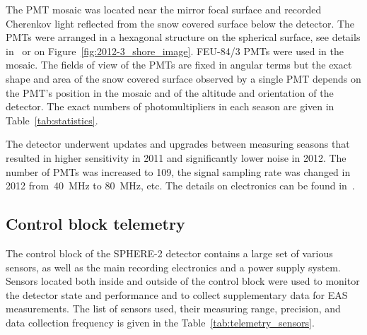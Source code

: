 \documentclass[universe,article,submit,moreauthors,pdftex]{Definitions/mdpi}
\begin{document}
The PMT mosaic was located near the mirror focal surface and recorded Cherenkov light reflected from the snow covered surface below the detector. The PMTs were arranged in a hexagonal structure on the spherical surface, see details in~\cite{Ant20} or on Figure~\ref{fig:2012-3_shore_image}. FEU-84/3 PMTs were used in the mosaic. The fields of view of the PMTs are fixed in angular terms but the exact shape and area of the snow covered surface observed by a single PMT depends on the PMT's position in the mosaic and of the altitude and orientation of the detector. The exact numbers of photomultipliers in each season are given in Table~\ref{tab:statistics}. 

The detector underwent updates and upgrades between measuring seasons that resulted in higher sensitivity in 2011 and significantly lower noise in 2012. The number of PMTs was increased to 109, the signal sampling rate was changed in 2012 from~40~MHz to 80~MHz, etc. The details on electronics can be found in~\cite{Ant20}.


\subsection{Control block telemetry}

The control block of the SPHERE-2 detector contains a large set of various sensors, as well as the main recording electronics and a power supply system. Sensors located both inside and outside of the control block were used to monitor the detector state and performance and to collect supplementary data for EAS measurements. The list of sensors used, their measuring range, precision, and data collection frequency is given in the Table~\ref{tab:telemetry_sensors}. 
\end{document}

